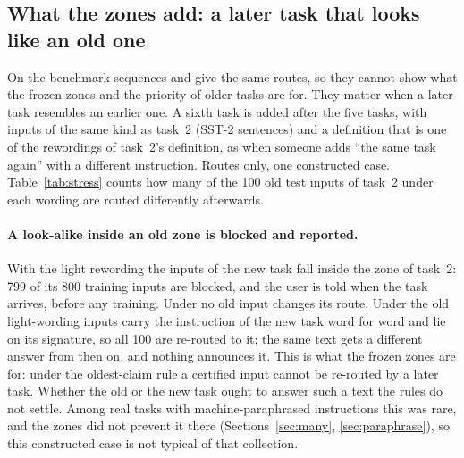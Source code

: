 \subsection{What the zones add: a later task that looks like an old one}
\label{sec:stress}

On the benchmark sequences \nearest{} and \cert{} give the same routes, so they cannot show what the frozen zones and the priority of older tasks are for. They matter when a later task resembles an earlier one. A sixth task is added after the five tasks, with inputs of the same
kind as task~2 (SST-2 sentences) and a definition that is one of the rewordings of task~2's definition, as when someone adds ``the same task again'' with a different
instruction. Routes only, one constructed case. Table~\ref{tab:stress} counts how many of the
100 old test inputs of task~2 under each wording are routed differently afterwards.

\begin{table}[t]
  \caption{Stress test (T5-base word-vectors). A sixth task with SST-2 inputs and a
  reworded SST-2 definition is added after the five tasks. ``Blocked'': training
  inputs of the new task inside an older zone, reported when the task arrives. ``Routes
  changed'': old test inputs of task~2 (100 per wording) given to a different task
  afterwards.}
  \label{tab:stress}
  \centering
  \small
  \setlength{\tabcolsep}{4pt}
  
\end{table}

\paragraph{A look-alike inside an old zone is blocked and reported.} With the light rewording the inputs of the new task fall inside the zone of task~2: 799 of
its 800 training inputs are blocked, and the user is told when the task arrives, before any
training. Under \cert{} no old input changes its route. Under \nearest{} the old light-wording inputs carry the
instruction of the new task word for word and lie on its signature, so all 100 are
re-routed to it; the same text gets a different answer from then on, and nothing announces it. This is what the frozen zones are for: under the oldest-claim rule a certified input cannot be re-routed by a later task. Whether the old or the new task ought to answer such a text the rules do not
settle. Among \WidenTasksEval{} real tasks with machine-paraphrased instructions this was rare, and the zones did not prevent it there (Sections~\ref{sec:many}, \ref{sec:paraphrase}), so this constructed case is not typical of that collection.

